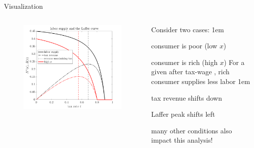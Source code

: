 \documentclass[11pt,aspectratio=43]{beamer}
\let\olditemize=\itemize
\let\endolditemize=\enditemize
\renewenvironment{itemize}{\olditemize \itemsep1em}{\endolditemize}
\let\oldenumerate=\enumerate
\let\endoldenumerate=\endenumerate
\renewenvironment{enumerate}{\oldenumerate \itemsep1em}{ \endoldenumerate}
\theoremstyle{definition}
\begin{document}
\begin{frame}{Visualization}
\label{slide:Visualization}
    \begin{columns}
        \begin{column}{0.5\textwidth}
            \begin{figure}
                \includegraphics[width=\textwidth]{./figures/lafferCurve.png}
            \end{figure}


        \end{column}
        \begin{column}{0.5\textwidth}
            Consider two cases:
            \begin{enumerate}
                \item consumer is poor (low $ x $)
                \item consumer is rich (high $ x $)
            \end{enumerate}
            For a given after tax-wage , rich consumer supplies less labor
            \begin{itemize}
                \item tax revenue shifts down
                \item Laffer peak shifts left
                \item many other conditions also impact this analysis!
            \end{itemize}
        \end{column}
    \end{columns}
\end{frame}
\end{document}
